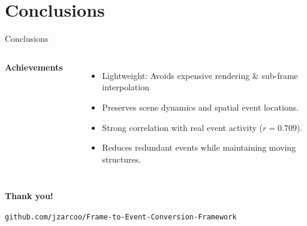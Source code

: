 \documentclass[10pt,xcolor=x11names,compress]{beamer}
\begin{document}
\section{Conclusions}

\begin{frame}{Conclusions}

  \begin{columns}[T]


    {\Large\bfseries Achievements}

    \vspace{0.1cm}
    \color{colorLeft}\rule{\linewidth}{1pt}

    \vspace{0.1cm}

    \begin{itemize}
    \item[$\checkmark$] Lightweight: Avoids expensive rendering \& sub-frame interpolation
    \item[$\checkmark$] Preserves scene dynamics and spatial event locations.
    \item[$\checkmark$] Strong correlation with real event activity
      ($r=0.709$).
    \item[$\checkmark$] Reduces redundant events while maintaining moving structures.
    \end{itemize}








  \end{columns}

  \vfill

  \begin{center}
    \Large\bfseries
    Thank you!
  \end{center}

  \begin{center}
    \small
    \texttt{github.com/jzarcoo/Frame-to-Event-Conversion-Framework}
  \end{center}

\end{frame}
\end{document}
